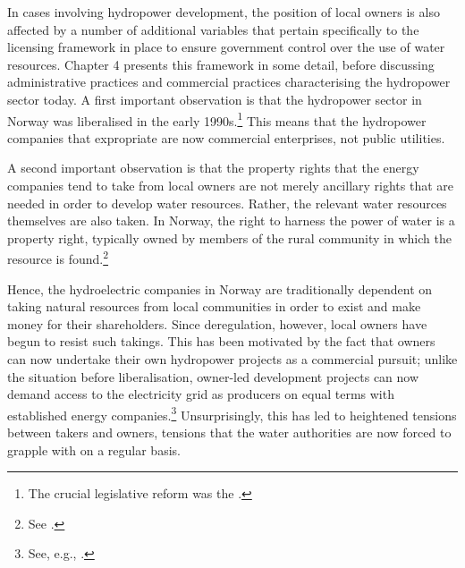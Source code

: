 In cases involving hydropower development, the position of local owners is also affected by a number of additional variables that pertain specifically to the licensing framework in place to ensure government control over the use of water resources. Chapter 4 presents this framework in some detail, before discussing administrative practices and commercial practices characterising the hydropower sector today. A first important observation is that the hydropower sector in Norway was liberalised in the early 1990s.\footnote{The crucial legislative reform was the \cite{ea90}.} This means that the hydropower companies that expropriate are now commercial enterprises, not public utilities.

A second important observation is that the property rights that the energy companies tend to take from local owners are not merely ancillary rights that are needed in order to develop water resources. Rather, the relevant water resources themselves are also taken. In Norway, the right to harness the power of water is a property right, typically owned by members of the rural community in which the resource is found.\footnote{See \cite[13]{wra00}.}

Hence, the hydroelectric companies in Norway are traditionally dependent on taking natural resources from local communities in order to exist and make money for their shareholders. Since deregulation, however, local owners have begun to resist such takings. This has been motivated by the fact that owners can now undertake their own hydropower projects as a commercial pursuit; unlike the situation before liberalisation, owner-led development projects can now demand access to the electricity grid as producers on equal terms with established energy companies.\footnote{See, e.g., \cite{uleberg08}.} Unsurprisingly, this has led to heightened tensions between takers and owners, tensions that the water authorities are now forced to grapple with on a regular basis.


